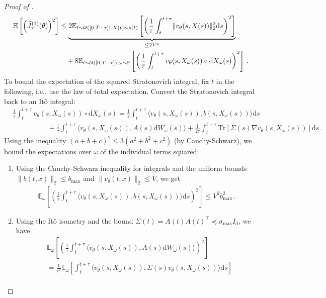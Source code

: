 \documentclass[oneside,11pt]{article}
\theoremstyle{remark}
\begin{document}
\begin{proof}[Proof of ]
\begin{align*}
\mathbb{E} \left[ \left(\widehat{J}^{(1)}_\tau(\theta) \right)^2 \right] &\leq \underbrace{2 \mathbb{E}_{t \sim {\cal U}([0, T - \tau]),X(t) \sim \rho(t)} \left[ \left(\frac{1}{\tau} \int_{t}^{t+\tau} \lVert v_\theta(s, X(s)) \rVert_2^2 \mathrm{d}s \right)^2 \right]}_{\leq 2 V^4} \\
& \quad+ 8 \mathbb{E}_{t \sim {\cal U}([0, T - \tau]), \omega \sim \mathbb{P}} \left[ \left(\frac{1}{\tau}\int_{t}^{t+\tau} v_\theta(s, X_\omega(s)) \circ \mathrm{d} X_\omega(s) \right)^2 \right]\,.
\end{align*}
To bound the expectation of the squared Stratonovich integral, fix $t$ in the following, i.e., use the law of total expectation. Convert the Stratonovich integral back to an It{\^o} integral:
\begin{align*}
&\frac{1}{\tau} \int_{t}^{t+\tau} v_\theta(s, X_\omega(s)) \circ \mathrm{d} X_\omega(s) = \frac{1}{\tau}\int_{t}^{t+\tau} \langle v_\theta(s, X_\omega(s)), b(s, X_\omega(s)) \rangle \mathrm{d} s \\
&\qquad \qquad \quad + \frac{1}{\tau}\int_{t}^{t+\tau} \langle v_\theta(s, X_\omega(s)), A(s) \mathrm{d} W_\omega(s) \rangle
+ \frac{1}{2\tau} \int_{t}^{t+\tau} \text{Tr}\left[\Sigma(s) \nabla v_\theta(s, X_\omega(s)) \right] \mathrm{d} s\,.
\end{align*}
Using the inequality $(a+b+c)^2 \leq 3(a^2 + b^2 + c^2)$ (by Cauchy-Schwarz), we bound the expectations over $\omega$ of the individual terms squared:
\begin{enumerate}
    \item Using the Cauchy-Schwarz inequality for integrals and the uniform bounds $\lVert b(t,x) \rVert_2 \leq b_{\text{max}}$ and $\lVert v_\theta(t,x) \rVert_2 \leq V$, we get
\begin{align*}
\mathbb{E}_\omega \left[ \left( \frac{1}{\tau} \int_{t}^{t+\tau}  \langle v_\theta(s, X_\omega(s)), b(s, X_\omega(s)) \rangle \mathrm{d}s \right)^2 \right] \leq V^2 b_{\text{max}}^2\,.
\end{align*}
\item Using the It{\^o} isometry and the bound $\Sigma(t) = A(t)A(t)^\top \preceq \sigma_{\text{max}} I_d$, we have
\begin{align*}
&\mathbb{E}_\omega  \left[ \left( \frac{1}{\tau} \int_{t}^{t+\tau} \langle v_\theta(s, X_\omega(s)), A(s) \mathrm{d} W_\omega(s) \rangle \right)^2 \right]\\
&= \frac{1}{\tau^2} \mathbb{E}_\omega  \left[ \int_{t}^{t+\tau} \langle v_\theta(s, X_\omega(s)),  \Sigma(s) v_\theta(s, X_\omega(s)) \rangle \mathrm{d}s \right] \\

\end{align*}
\end{enumerate}
\end{proof}
\end{document}
